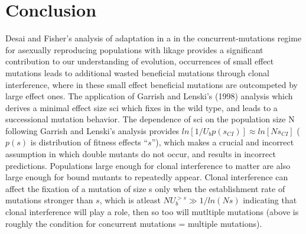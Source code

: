 \documentclass[12pt, one column]{article}
\begin{document}
\section*{Conclusion}
Desai and Fisher's analysis of adaptation in a in the concurrent-mutations regime for asexually reproducing populations with likage provides a significant contribution to our understanding of evolution, occurrences of small effect mutations leads to additional wasted beneficial mutations through clonal interference, where in these small effect beneficial mutations are outcompeted by large effect ones.  The application of Garrish and Lenski's (1998) analysis which derives a minimal effect size sci which fixes in the wild type, and leads to a successional mutation behavior.  The dependence of sci on the population size N following Garrish and Lenski's analysis provides $ln[1/U_b p(s_{CI})]\approx ln[Ns_{CI}]$ ($p(s)$ is distribution of fitness effects “$s$”), which makes a crucial and incorrect assumption in which double mutants do not occur, and results in incorrect predictions. Populations large enough for clonal interference to matter are also large enough for bound mutants to repeatedly appear.  Clonal interference can affect the fixation of a mutation of size s only when the establishment rate of  mutations stronger than $s$, which is atleast $NU_b^{>s} \gg 1/ln(Ns)$ indicating that clonal interference will play a role, then so too will mutltiple mutations (above is roughly the condition for concurrent mutations = multiple mutations). 



\end{document}
